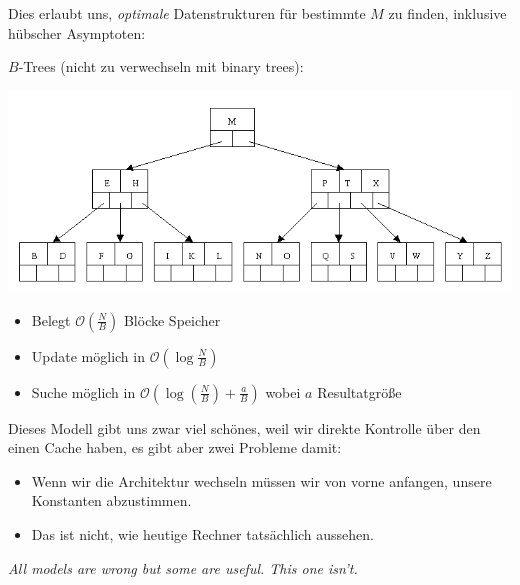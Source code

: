 \documentclass{beamer}
\begin{document}

\begin{frame}
Dies erlaubt uns, \emph{optimale} Datenstrukturen für bestimmte $M$ zu finden, inklusive
hübscher Asymptoten:\pause\bigskip

$B$-Trees (nicht zu verwechseln mit binary trees):
\begin{center}
\includegraphics[scale=0.35]{btree1.png}
\end{center}
\pause

\begin{itemize}
\item Belegt $\mathcal{O}(\frac{N}{B})$ Blöcke Speicher
\item Update möglich in $\mathcal{O}(\log{}\frac{N}{B})$
\item Suche möglich in $\mathcal{O}(\log{\left(\frac{N}{B}\right)} + \frac{a}{B})$ wobei $a$ Resultatgröße
\end{itemize}
\end{frame}


\begin{frame}

Dieses Modell gibt uns zwar viel schönes, weil wir direkte Kontrolle über den einen Cache haben, es gibt aber zwei Probleme damit:\pause

\begin{itemize}
\item Wenn wir die Architektur wechseln müssen wir von vorne anfangen, unsere Konstanten abzustimmen.\pause
\item Das ist nicht, wie heutige Rechner tatsächlich aussehen.\pause
\end{itemize}
\bigskip

\begin{center}
\emph{All models are wrong but some are useful. This one isn't.}
\end{center}
\end{frame}
\end{document}
